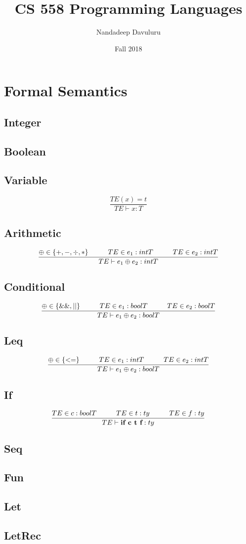 \documentclass{article}
\title{CS 558 Programming Languages}
\author{Nandadeep Davuluru}
\date{Fall 2018}
\newcommand\tab[1][1cm]{\hspace*{#1}}
\begin{document}
\maketitle

\section{Formal Semantics}

    \subsection{Integer}
    
    \subsection{Boolean}
    \subsection{Variable}
        \begin{equation}
            \frac{TE(x) = t}{TE \vdash x : T}
        \end{equation}
    \subsection{Arithmetic}
        \begin{equation}
            \frac{\oplus \in \{+, -, \div, *\} \tab TE \in e_1 : intT \tab TE \in e_2 : intT}{TE \vdash e_1 \oplus e_2 : intT}
        \end{equation}
    \subsection{Conditional}
        \begin{equation}
            \frac{\oplus \in \{\&\&, || \} \tab TE \in e_1 : boolT \tab TE \in e_2 : boolT}{TE \vdash e_1 \oplus e_2 : boolT}
        \end{equation}
    \subsection{Leq}
        \begin{equation}
            \frac{\oplus \in \{ <= \} \tab TE \in e_1 : intT \tab TE \in e_2 : intT}{TE \vdash e_1 \oplus e_2 : boolT}
        \end{equation}
    \subsection{If}
         \begin{equation}
            \frac{TE \in c : boolT \tab TE \in t : ty \tab TE \in f : ty}{TE \vdash \textbf{if c t f} : ty}
        \end{equation}
    \subsection{Seq}
    \subsection{Fun}
    \subsection{Let}
    \subsection{LetRec}
    
\end{document}
